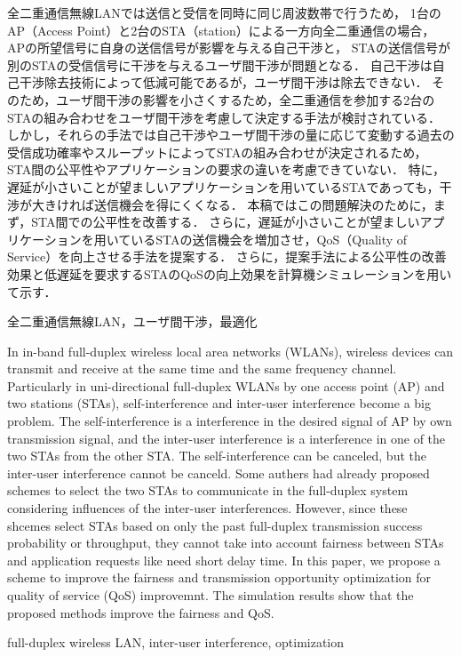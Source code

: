 \documentclass[technicalreport]{ieicej}
\begin{document}
\begin{jabstract}
	全二重通信無線LANでは送信と受信を同時に同じ周波数帯で行うため，
	1台のAP（Access Point）と2台のSTA（station）による一方向全二重通信の場合，
	APの所望信号に自身の送信信号が影響を与える自己干渉と，
	STAの送信信号が別のSTAの受信信号に干渉を与えるユーザ間干渉が問題となる．
	自己干渉は自己干渉除去技術によって低減可能であるが，ユーザ間干渉は除去できない．
	そのため，ユーザ間干渉の影響を小さくするため，全二重通信を参加する2台のSTAの組み合わせをユーザ間干渉を考慮して決定する手法が検討されている．
	しかし，それらの手法では自己干渉やユーザ間干渉の量に応じて変動する過去の受信成功確率やスループットによってSTAの組み合わせが決定されるため，
	STA間の公平性やアプリケーションの要求の違いを考慮できていない．
	特に，遅延が小さいことが望ましいアプリケーションを用いているSTAであっても，干渉が大きければ送信機会を得にくくなる．
	本稿ではこの問題解決のために，まず，STA間での公平性を改善する．
	さらに，遅延が小さいことが望ましいアプリケーションを用いているSTAの送信機会を増加させ，QoS（Quality of Service）を向上させる手法を提案する．
	さらに，提案手法による公平性の改善効果と低遅延を要求するSTAのQoSの向上効果を計算機シミュレーションを用いて示す．
\end{jabstract}
\begin{jkeyword}
全二重通信無線LAN，ユーザ間干渉，最適化
\end{jkeyword}
\begin{eabstract}
	In in-band full-duplex wireless local area networks (WLANs), wireless devices can transmit and receive at the same time and the same frequency channel.
	Particularly in uni-directional full-duplex WLANs by one access point (AP) and two stations (STAs), self-interference and inter-user interference become a big problem.
	The self-interference is a interference in the desired signal of AP by own transmission signal, and the inter-user interference is a interference in one of the two STAs from the other STA.
	The self-interference can be canceled, but the inter-user interference cannot be canceld.
	Some authers had already proposed schemes to select the two STAs to communicate in the full-duplex system considering influences of the inter-user interferences.
	However, since these shcemes select STAs based on only the past full-duplex transmission success probability or throughput, they cannot take into account fairness between STAs and application requests like need short delay time.
	In this paper, we propose a scheme to improve the fairness and transmission opportunity optimization for quality of service (QoS) improvemnt.
	The simulation results show that the proposed methods improve the fairness and QoS.

\end{eabstract}
\begin{ekeyword}
full-duplex wireless LAN, inter-user interference, optimization
\end{ekeyword}
\end{document}
